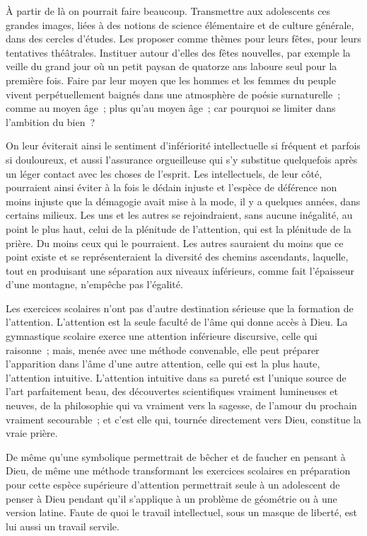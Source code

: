 \documentclass[french,twoside]{book} %
\begin{document}
À partir de là on pourrait faire beaucoup. Transmettre aux adolescents ces grandes images, liées à des notions de science élémentaire et de culture générale, dans des cercles d'études. Les proposer comme thèmes pour leurs fêtes, pour leurs tentatives théâtrales. Instituer autour d'elles des fêtes nouvelles, par exemple la veille du grand jour où un petit paysan de quatorze ans laboure seul pour la première fois. Faire par leur moyen que les hommes et les femmes du peuple vivent perpétuellement baignés dans une atmosphère de poésie surnaturelle ; comme au moyen âge ; plus qu'au moyen âge ; car pourquoi se limiter dans l'ambition du bien ?\par
On leur éviterait ainsi le sentiment d'infériorité intellectuelle si fréquent et parfois si douloureux, et aussi l'assurance orgueilleuse qui s'y substitue quelquefois après un léger contact avec les choses de l'esprit. Les intellectuels, de leur côté, pourraient ainsi éviter à la fois le dédain injuste et l'espèce de déférence non moins injuste que la démagogie avait mise à la mode, il y a quelques années, dans certains milieux. Les uns et les autres se rejoindraient, sans aucune inégalité, au point le plus haut, celui de la plénitude de l'attention, qui est la plénitude de la prière. Du moins ceux qui le pourraient. Les autres sauraient du moins que ce point existe et se représenteraient la diversité des chemins ascendants, laquelle, tout en produisant une séparation aux niveaux inférieurs, comme fait l'épaisseur d'une montagne, n'empêche pas l'égalité.\par
Les exercices scolaires n'ont pas d'autre destination sérieuse que la formation de l'attention. L'attention est la seule faculté de l'âme qui donne accès à Dieu. La gymnastique scolaire exerce une attention inférieure discursive, celle qui raisonne ; mais, menée avec une méthode convenable, elle peut préparer l'apparition dans l'âme d'une autre attention, celle qui est la plus haute, l'attention intuitive. L'attention intuitive dans sa pureté est l'unique source de l'art parfaitement beau, des découvertes scientifiques vraiment lumineuses et neuves, de la philosophie qui va vraiment vers la sagesse, de l'amour du prochain vraiment secourable ; et c'est elle qui, tournée directement vers Dieu, constitue la vraie prière.\par
De même qu'une symbolique permettrait de bêcher et de faucher en pensant à Dieu, de même une méthode transformant les exercices scolaires en préparation pour cette espèce supérieure d'attention permettrait seule à un adolescent de penser à Dieu pendant qu'il s'applique à un problème de géométrie ou à une version latine. Faute de quoi le travail intellectuel, sous un masque de liberté, est lui aussi un travail servile.\par
\end{document}
